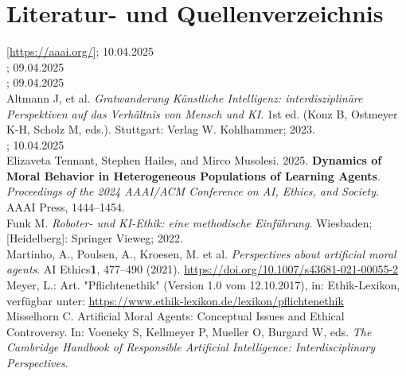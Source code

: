 \section{Literatur- und Quellenverzeichnis}\label{sec::literaturverzeichnis}

[\href{https://aaai.org/}{https://aaai.org/}]; 10.04.2025 \\
; 09.04.2025 \\
; 09.04.2025 \\
\newline
Altmann J, et al.
\textit{Gratwanderung Künstliche Intelligenz: interdisziplinäre Perspektiven auf das Verhältnis von Mensch und KI}.
1st ed.
(Konz B, Ostmeyer K-H, Scholz M, eds.). Stuttgart: Verlag W. Kohlhammer; 2023. \\
; 10.04.2025 \\
\newline
Elizaveta Tennant, Stephen Hailes, and Mirco Musolesi. 2025.
\textbf{Dynamics of Moral Behavior in Heterogeneous Populations of Learning Agents}.
\textit{Proceedings of the 2024 AAAI/ACM Conference on AI, Ethics, and Society}.
AAAI Press, 1444–1454. \\
\newline
Funk M.
\textit{Roboter- und KI-Ethik: eine methodische Einführung}.
Wiesbaden; [Heidelberg]: Springer Vieweg; 2022. \\
\newline
Martinho, A., Poulsen, A., Kroesen, M. et al. \textit{Perspectives about artificial moral agents}.
AI Ethics\textbf{1}, 477–490 (2021).
\href{https://doi.org/10.1007/s43681-021-00055-2}{https://doi.org/10.1007/s43681-021-00055-2} \\
\newline
Meyer, L.: Art.
"Pflichtenethik" (Version 1.0 vom 12.10.2017), in: Ethik-Lexikon, verfügbar unter:
\href{https://www.ethik-lexikon.de/lexikon/pflichtenethik}{https://www.ethik-lexikon.de/lexikon/pflichtenethik} \\
\newline
Misselhorn C. Artificial Moral Agents:
Conceptual Issues and Ethical Controversy.
In: Voeneky S, Kellmeyer P, Mueller O, Burgard W, eds.
\textit{The Cambridge Handbook of Responsible Artificial Intelligence: Interdisciplinary Perspectives}.
